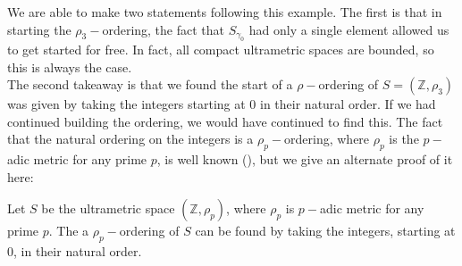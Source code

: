 We are able to make two statements following this example. The first is that in starting the $\rho_3-$ordering, the fact that $S_{\gamma_0}$ had only a single element allowed us to get started for free. In fact,  all compact ultrametric spaces are bounded, so this is always the case. \\

The second takeaway is that we found the start of a $\rho-$ordering of $S=(\mathbb{Z}, \rho_3)$ was given by taking the integers starting at $0$ in their natural order. If we had continued building the ordering, we would have continued to find this. The fact that the natural ordering on the integers is a $\rho_p-$ordering, where $\rho_p$ is the $p-$adic metric for any prime $p$, is well known (\cite{mb1}), but we give an alternate proof of it here:\\ 

\begin{corollary} 
Let $S$ be the ultrametric space $(\mathbb{Z}, \rho_p)$, where $\rho_p$ is  $p-$adic metric for any prime $p$. The a $\rho_p-$ordering of $S$ can be found by taking the integers, starting at $0$, in their natural order.
\end{corollary}

